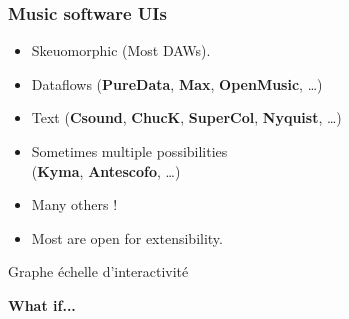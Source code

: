 \documentclass[draft]{beamer}
\begin{document}
\begin{frame}
	\frametitle{Music software UIs}    
	\Large
	\begin{itemize}
        \item<1-> Skeuomorphic (Most DAWs).
		\item<2-> Dataflows (\textbf{PureData}, \textbf{Max}, \textbf{OpenMusic}, \dots)
		\item<3-> Text (\textbf{Csound}, \textbf{ChucK}, \textbf{SuperCol}, \textbf{Nyquist}, \dots)
		\item<4-> Sometimes multiple possibilities~\\ (\textbf{Kyma}, \textbf{Antescofo}, \dots)
        \item<5-> Many others !
        \item<6-> Most are open for extensibility.
	\end{itemize}
\end{frame}

\begin{frame}
    Graphe échelle d'interactivité
\end{frame}
\begin{frame}
	\Huge
    \centering
    \textbf{What if...}
\end{frame}
\end{document}
